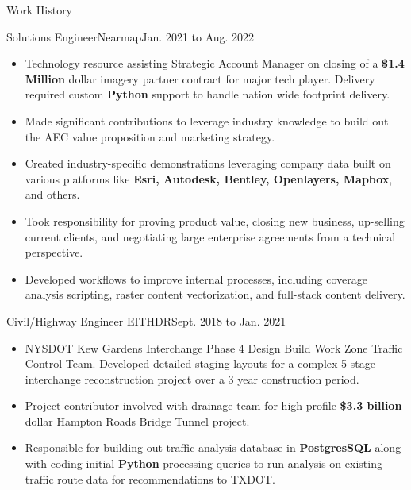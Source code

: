 \documentclass[]{mcdowellcv}
\begin{document}
\begin{cvsection}{Work History}
		\begin{cvsubsection}{Solutions Engineer}{Nearmap}{Jan. 2021 to Aug. 2022}
		\begin{itemize}
                 \item Technology resource assisting Strategic Account Manager on closing of a \textbf{\$1.4 Million} dollar imagery partner contract for major tech player. Delivery required custom \textbf{Python} support to handle nation wide footprint delivery. 
                \item Made significant contributions to leverage industry knowledge to build out the AEC value proposition and marketing strategy.
                \item Created industry-specific demonstrations leveraging company data built on various platforms like \textbf{Esri, Autodesk, Bentley, Openlayers, Mapbox}, and others.
                \item Took responsibility for proving product value, closing new business, up-selling current clients, and negotiating large enterprise agreements from a technical perspective.
                \item Developed workflows to improve internal processes, including coverage analysis scripting, raster content vectorization, and full-stack content delivery.
            \end{itemize}

		\end{cvsubsection}
		
		\begin{cvsubsection}{Civil/Highway Engineer EIT}{HDR}{Sept. 2018 to Jan. 2021}
			\begin{itemize}
				\item NYSDOT Kew Gardens Interchange Phase 4 Design Build Work Zone Traffic Control Team. Developed detailed staging layouts for a complex 5-stage interchange reconstruction project over a 3 year construction period. 
                \item Project contributor involved with drainage team for high profile  \textbf{\$3.3 billion} dollar Hampton Roads Bridge Tunnel project.
                 \item Responsible for building out traffic analysis database in \textbf{PostgresSQL} along with coding initial \textbf{Python} processing queries to run analysis on existing traffic route data for recommendations to TXDOT.  
                
			\end{itemize}
		\end{cvsubsection}
		

\end{cvsection}
\end{document}
